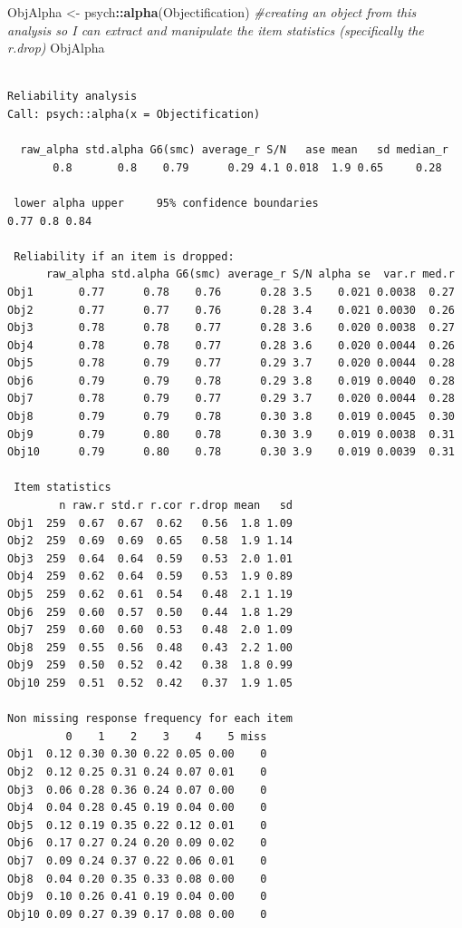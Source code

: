 \documentclass[
  english,
]{book}
\newenvironment{Shaded}{\begin{snugshade}}{\end{snugshade}}
\newcommand{\CommentTok}[1]{\textcolor[rgb]{0.56,0.35,0.01}{\textit{#1}}}
\newcommand{\KeywordTok}[1]{\textcolor[rgb]{0.13,0.29,0.53}{\textbf{#1}}}
\newcommand{\NormalTok}[1]{#1}
\newcommand{\OperatorTok}[1]{\textcolor[rgb]{0.81,0.36,0.00}{\textbf{#1}}}
\newcommand{\StringTok}[1]{\textcolor[rgb]{0.31,0.60,0.02}{#1}}
\begin{document}
\begin{Shaded}
\begin{Highlighting}[]
\NormalTok{ObjAlpha <-}\StringTok{ }\NormalTok{psych}\OperatorTok{::}\KeywordTok{alpha}\NormalTok{(Objectification) }\CommentTok{#creating an object from this analysis so I can extract and manipulate the item statistics (specifically the r.drop)}
\NormalTok{ObjAlpha}
\end{Highlighting}
\end{Shaded}

\begin{verbatim}

Reliability analysis   
Call: psych::alpha(x = Objectification)

  raw_alpha std.alpha G6(smc) average_r S/N   ase mean   sd median_r
       0.8       0.8    0.79      0.29 4.1 0.018  1.9 0.65     0.28

 lower alpha upper     95% confidence boundaries
0.77 0.8 0.84 

 Reliability if an item is dropped:
      raw_alpha std.alpha G6(smc) average_r S/N alpha se  var.r med.r
Obj1       0.77      0.78    0.76      0.28 3.5    0.021 0.0038  0.27
Obj2       0.77      0.77    0.76      0.28 3.4    0.021 0.0030  0.26
Obj3       0.78      0.78    0.77      0.28 3.6    0.020 0.0038  0.27
Obj4       0.78      0.78    0.77      0.28 3.6    0.020 0.0044  0.26
Obj5       0.78      0.79    0.77      0.29 3.7    0.020 0.0044  0.28
Obj6       0.79      0.79    0.78      0.29 3.8    0.019 0.0040  0.28
Obj7       0.78      0.79    0.77      0.29 3.7    0.020 0.0044  0.28
Obj8       0.79      0.79    0.78      0.30 3.8    0.019 0.0045  0.30
Obj9       0.79      0.80    0.78      0.30 3.9    0.019 0.0038  0.31
Obj10      0.79      0.80    0.78      0.30 3.9    0.019 0.0039  0.31

 Item statistics 
        n raw.r std.r r.cor r.drop mean   sd
Obj1  259  0.67  0.67  0.62   0.56  1.8 1.09
Obj2  259  0.69  0.69  0.65   0.58  1.9 1.14
Obj3  259  0.64  0.64  0.59   0.53  2.0 1.01
Obj4  259  0.62  0.64  0.59   0.53  1.9 0.89
Obj5  259  0.62  0.61  0.54   0.48  2.1 1.19
Obj6  259  0.60  0.57  0.50   0.44  1.8 1.29
Obj7  259  0.60  0.60  0.53   0.48  2.0 1.09
Obj8  259  0.55  0.56  0.48   0.43  2.2 1.00
Obj9  259  0.50  0.52  0.42   0.38  1.8 0.99
Obj10 259  0.51  0.52  0.42   0.37  1.9 1.05

Non missing response frequency for each item
         0    1    2    3    4    5 miss
Obj1  0.12 0.30 0.30 0.22 0.05 0.00    0
Obj2  0.12 0.25 0.31 0.24 0.07 0.01    0
Obj3  0.06 0.28 0.36 0.24 0.07 0.00    0
Obj4  0.04 0.28 0.45 0.19 0.04 0.00    0
Obj5  0.12 0.19 0.35 0.22 0.12 0.01    0
Obj6  0.17 0.27 0.24 0.20 0.09 0.02    0
Obj7  0.09 0.24 0.37 0.22 0.06 0.01    0
Obj8  0.04 0.20 0.35 0.33 0.08 0.00    0
Obj9  0.10 0.26 0.41 0.19 0.04 0.00    0
Obj10 0.09 0.27 0.39 0.17 0.08 0.00    0
\end{verbatim}
\end{document}
